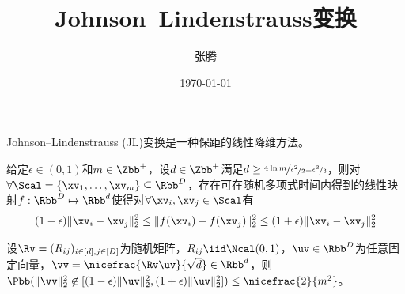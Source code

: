 \documentclass{ctexart}
\begin{document}
\title{\textbf{Johnson–Lindenstrauss变换}}
\author{张腾}
\date{\today}
\maketitle

Johnson–Lindenstrauss (JL)变换是一种保距的线性降维方法。

\begin{theorem} [JL变换]
    给定$\epsilon \in (0,1)$和$m \in \Zbb^+$，设$d \in \Zbb^+$满足$d \ge \nicefrac{4 \ln m}{\nicefrac{\epsilon^2}{2} - \nicefrac{\epsilon^3}{3}}$，则对$\forall \Scal = \{ \xv_1, \ldots, \xv_m \} \subseteq \Rbb^D$，存在可在随机多项式时间内得到的线性映射$f: \Rbb^D \mapsto \Rbb^d$使得对$\forall \xv_i, \xv_j \in \Scal$有
    \begin{align*}
        (1 - \epsilon) \| \xv_i - \xv_j \|_2^2 \le \| f(\xv_i) - f(\xv_j) \|_2^2 \le (1 + \epsilon) \| \xv_i - \xv_j \|_2^2
    \end{align*}
\end{theorem}

\begin{lemma}
    设$\Rv = (R_{ij})_{i \in [d], j \in [D]}$为随机矩阵，$R_{ij} \iid \Ncal(0,1)$，$\uv \in \Rbb^D$为任意固定向量，$\vv = \nicefrac{\Rv \uv}{\sqrt{d}} \in \Rbb^d$，则$\Pbb ( \| \vv \|_2^2 \not \in [(1 - \epsilon) \|\uv\|_2^2, (1 + \epsilon) \|\uv\|_2^2]) \le \nicefrac{2}{m^2}$。
\end{lemma}
\end{document}
